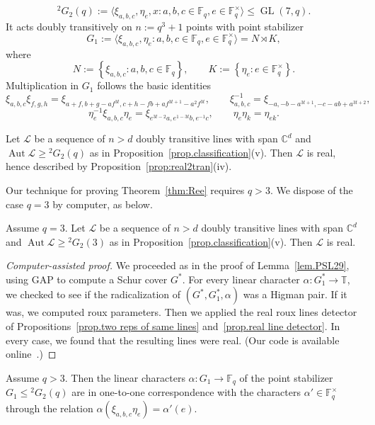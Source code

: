 \[
{}^2G_2(q) := \langle \xi_{a,b,c}, \eta_e, x : a,b,c \in \mathbb{F}_q, e \in \mathbb{F}_q^\times \rangle \leq \operatorname{GL}(7,q).
\]
It acts doubly transitively on $n := q^3 + 1$ points with point stabilizer
\[
G_1 := \langle \xi_{a,b,c}, \eta_e : a,b,c \in \mathbb{F}_q, e \in \mathbb{F}_q^\times \rangle
=
N \rtimes K,
\]
where
\[
N := \left\{ \xi_{a,b,c} : a,b,c \in \mathbb{F}_q \right\},
\qquad
K := \left\{ \eta_e : e \in \mathbb{F}_q^\times \right\}.
\]
Multiplication in $G_1$ follows the basic identities
\[
\xi_{a,b,c} \xi_{f,g,h}
=
\xi_{a+f,b+g-af^{3t},c+h-fb+af^{3t+1}-a^2f^{3t}},
\qquad
\xi_{a,b,c}^{-1}
=
\xi_{-a, -b-a^{3t+1}, -c-ab+a^{3t+2} },
\]
\[
\eta_e^{-1} \xi_{a,b,c} \eta_e
=
\xi_{e^{3t-2} a, e^{1-3t} b, e^{-1} c},
\qquad
\eta_e \eta_k = \eta_{ek}.
\]

\begin{theorem}
\label{thm:Ree}
Let $\mathscr{L}$ be a sequence of $n > d$ doubly transitive lines with span $\mathbb{C}^d$ and $\operatorname{Aut} \mathscr{L} \geq {}^2G_2(q)$ as in Proposition~\ref{prop.classification}(v).
Then $\mathscr{L}$ is real, hence described by Proposition~\ref{prop:real2tran}(iv).
\end{theorem}

Our technique for proving Theorem~\ref{thm:Ree} requires $q>3$.
We dispose of the case $q=3$ by computer, as below.

\begin{lemma}
Assume $q=3$.
Let $\mathscr{L}$ be a sequence of $n > d$ doubly transitive lines with span $\mathbb{C}^d$ and $\operatorname{Aut} \mathscr{L} \geq {}^2G_2(3)$ as in Proposition~\ref{prop.classification}(v).
Then $\mathscr{L}$ is real.
\end{lemma}

\begin{proof}[Computer-assisted proof]
We proceeded as in the proof of Lemma~\ref{lem.PSL29}, using GAP to compute a Schur cover $G^*$.
For every linear character $\alpha \colon G_1^* \to \mathbb{T}$, we checked to see if the radicalization of $(G^*,G_1^*,\alpha)$ was a Higman pair.
If it was, we computed roux parameters.
Then we applied the real roux lines detector of Propositions~\ref{prop.two reps of same lines} and~\ref{prop.real line detector}.
In every case, we found that the resulting lines were real.
(Our code is available online~\cite{github}.)
\end{proof}

\begin{proposition}
\label{prop:ReeStab}
Assume $q > 3$.
Then the linear characters $\alpha \colon G_1 \to \mathbb{F}_q$ of the point stabilizer $G_1 \leq {}^2G_2(q)$ are in one-to-one correspondence with the characters $\alpha' \in \mathbb{F}_q^\times$ through the relation $\alpha(\xi_{a,b,c} \eta_e) = \alpha'(e)$.
\end{proposition}

